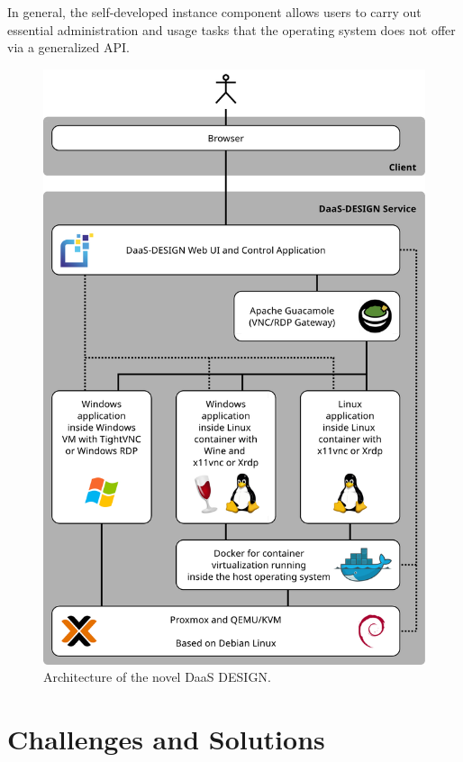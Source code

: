 \documentclass[runningheads]{llncs}
\begin{document}
In general, the self-developed instance component allows users to carry out essential administration and usage tasks that the operating system does not offer via a generalized API.



\begin{figure}
\includegraphics[width=\textwidth]{images/DaaS_DESIGN_Architecture_v11_english.pdf}
\caption{Architecture of the novel DaaS DESIGN.} \label{figure_architecture}
\end{figure}

\section{Challenges and Solutions}
\label{sec:AnalysisPossibleComponents}
\end{document}
